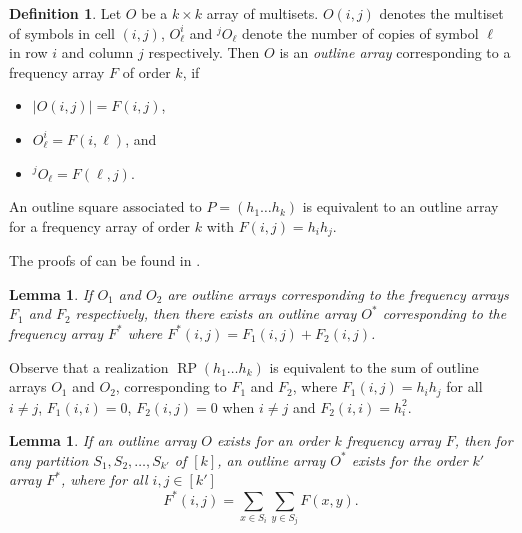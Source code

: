 \documentclass{sn-jnl}
\newtheorem{lemma}[theorem]{Lemma}
\theoremstyle{definition}
\newtheorem{definition}[theorem]{Definition}
\DeclareMathOperator{\LS}{RP}
\begin{document}
\begin{definition}
    Let $O$ be a $k\times k$ array of multisets. $O(i,j)$ denotes the multiset of symbols in cell $(i,j)$, $O_{\ell}^i$ and $^jO_\ell$ denote the number of copies of symbol $\ell$ in row $i$ and column $j$ respectively.
    Then $O$ is an \emph{outline array} corresponding to a frequency array $F$ of order $k$, if
    \begin{itemize}
        \item $|O(i,j)| = F(i,j)$,
        \item $O_\ell^i = F(i,\ell)$, and
        \item $^jO_\ell = F(\ell,j)$.
    \end{itemize}
\end{definition}

An outline square associated to $P = (h_1\dots h_k)$ is equivalent to an outline array for a frequency array of order $k$ with $F(i,j) = h_ih_j$.

The proofs of  can be found in \cite{kemp2025further}.

\begin{lemma}
\label{lemma: sum freq arrays}
    If $O_1$ and $O_2$ are outline arrays corresponding to the frequency arrays $F_1$ and $F_2$ respectively, then there exists an outline array $O^*$ corresponding to the frequency array $F^*$ where $F^*(i,j) = F_1(i,j) + F_2(i,j)$.
\end{lemma}

Observe that a realization $\LS(h_1\dots h_k)$ is equivalent to the sum of outline arrays $O_1$ and $O_2$, corresponding to $F_1$ and $F_2$, where $F_1(i,j) = h_ih_j$ for all $i\neq j$, $F_1(i,i) = 0$, $F_2(i,j) = 0$ when $i\neq j$ and $F_2(i,i) = h_i^2$.


\begin{lemma}
\label{lemma: summing rows/columns of outline array}
    If an outline array $O$ exists for an order $k$ frequency array $F$, then for any partition $S_1,S_2,\dots,S_{k'}$ of $[k]$, an outline array $O^*$ exists for the order $k'$ array $F^*$, where for all $i,j\in[k']$ $$F^*(i,j) = \sum_{x\in S_i}\sum_{y\in S_j}F(x,y).$$
\end{lemma}
\end{document}
